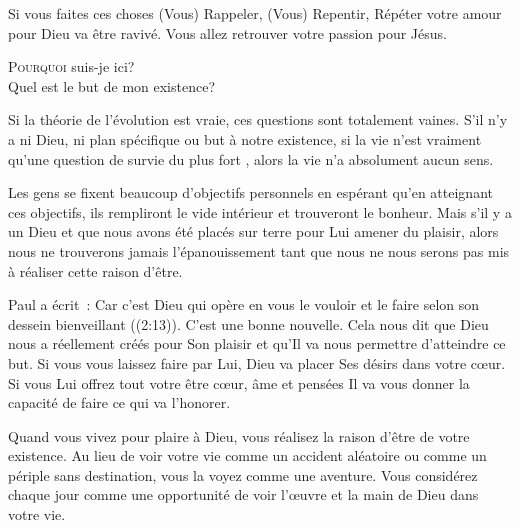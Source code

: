 Si vous faites ces choses
 \ocadr (Vous) Rappeler, (Vous) Repentir, Répéter \fcadr{}
 votre amour pour Dieu va être ravivé.
 Vous allez retrouver votre passion pour Jésus. 

\dvrule






\lettrine{P}{ourquoi} suis-je ici?\\
 Quel est le but de mon existence?

Si la théorie de l'évolution est vraie, ces questions sont totalement vaines.
 S'il n'y a ni Dieu, ni plan spécifique ou but à notre existence,
 si la vie n'est vraiment qu'une question de \og survie du plus fort \fg{},
 alors la vie n'a absolument aucun sens. 

Les gens se fixent beaucoup d'objectifs personnels en espérant
 qu'en atteignant ces objectifs, ils rempliront le vide intérieur
 et trouveront le bonheur. Mais s'il y a un Dieu et que nous avons
 été placés sur terre pour Lui amener du plaisir,
 alors nous ne trouverons jamais l'épanouissement
 tant que nous ne nous serons pas mis à réaliser cette raison d'être. 


Paul a écrit~: 
 \og Car c'est Dieu qui opère en vous le vouloir et le faire
 selon son dessein bienveillant \fg{} ((2:13)).
 C'est une bonne nouvelle. Cela nous dit que Dieu nous a réellement
 créés pour Son plaisir \ocadr et qu'Il va nous permettre d'atteindre ce but.
 Si vous vous laissez faire par Lui, Dieu va placer Ses désirs
 dans votre c\oe{}ur. Si vous Lui offrez tout votre être
 \ocadr c\oe{}ur, âme et pensées \fcadr{} Il va vous donner la capacité
 de faire ce qui va l'honorer. 

Quand vous vivez pour plaire à Dieu, vous réalisez la raison d'être
 de votre existence. Au lieu de voir votre vie comme un accident aléatoire
 ou comme un périple sans destination, vous la voyez comme une aventure.
 Vous considérez chaque jour comme une opportunité de voir l'\oe{}uvre
 et la main de Dieu dans votre vie. 


